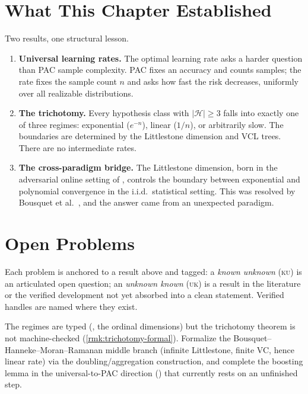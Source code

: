 \section{What This Chapter Established}
\label{sec:ch9-summary}

Two results, one structural lesson.

\begin{enumerate}[leftmargin=*,itemsep=3pt]
\item \textbf{Universal learning rates.}  The optimal learning rate asks a
  harder question than PAC sample complexity.  PAC fixes an accuracy and
  counts samples; the rate fixes the sample count $n$ and asks how fast the
  risk decreases, uniformly over all realizable distributions.

\item \textbf{The trichotomy.}  Every hypothesis class with
  $|\mathcal{H}| \geq 3$ falls into exactly one of three regimes:
  exponential ($e^{-n}$), linear ($1/n$), or arbitrarily slow.  The
  boundaries are determined by the Littlestone dimension and VCL trees.
  There are no intermediate rates.

\item \textbf{The cross-paradigm bridge.}  The Littlestone dimension, born
  in the adversarial online setting of , controls the
  boundary between exponential and polynomial convergence in the i.i.d.\
  statistical setting.  This was resolved by
  Bousquet et al.~\cite{BousquetHannekeMoranVanHandelYehudayoff2021}, and the
  answer came from an unexpected paradigm.
\end{enumerate}

\section{Open Problems}
\label{sec:ch9-open}

Each problem is anchored to a result above and tagged: a \emph{known unknown} (\textsc{ku}) is an articulated open question; an \emph{unknown known} (\textsc{uk}) is a result in the literature or the verified development not yet absorbed into a clean statement.  Verified handles are named where they exist.

\begin{openprob}
\label{op:trichotomy-formal}
The regimes are typed (, the ordinal dimensions) but the trichotomy theorem is not machine-checked (\cref{rmk:trichotomy-formal}).  Formalize the Bousquet--Hanneke--Moran--Ramanan middle branch (infinite Littlestone, finite VC, hence linear rate) via the doubling/aggregation construction, and complete the boosting lemma in the universal-to-PAC direction () that currently rests on an unfinished step.
\end{openprob}

